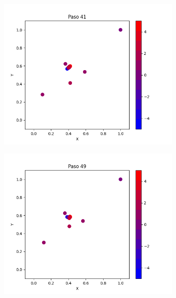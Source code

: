 \documentclass{report}
\begin{document}
\begin{figure}[h]
\begin{subfigure}[b]{0.3\textwidth}
         \includegraphics[width=\textwidth]{Images/Images_c/p9pc_t41.png}
     \end{subfigure}
     \begin{subfigure}[b]{0.3\textwidth}
         \centering
         \includegraphics[width=\textwidth]{Images/Images_c/p9pc_t49.png}
     \end{subfigure}
     \begin{subfigure}[b]{0.3\textwidth}
         \centering

\end{subfigure}
\end{figure}
\end{document}
